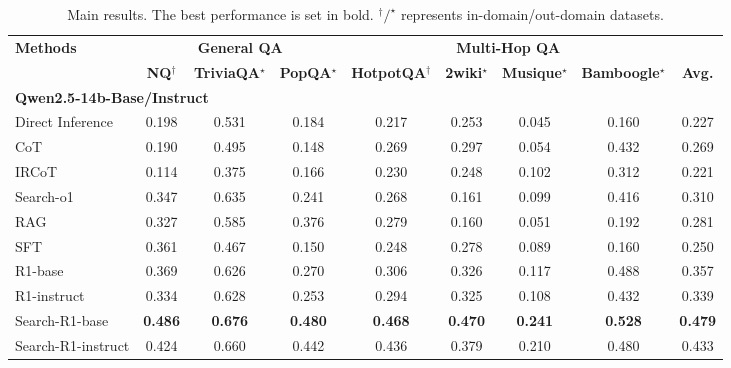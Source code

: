 \begin{table}[h]
    \centering
    \scriptsize
    \setlength{\tabcolsep}{4pt}
    \renewcommand{\arraystretch}{1.2}
    \caption{Main results. The best performance is set in bold. $^\dagger/^\star$ represents in-domain/out-domain datasets.}\label{apx:tab:largerllm}
    \begin{tabular}{lcccccccc}
        \toprule
        \textbf{Methods} & \multicolumn{3}{c}{\textbf{General QA}} & \multicolumn{4}{c}{\textbf{Multi-Hop QA}} \\
        \cmidrule{2-9}
         & \textbf{NQ$^\dagger$} & \textbf{TriviaQA$^\star$} & \textbf{PopQA$^\star$} & \textbf{HotpotQA$^\dagger$} & \textbf{2wiki$^\star$} & \textbf{Musique$^\star$} & \textbf{Bamboogle$^\star$} & \textbf{Avg.} \\
        \midrule
        \multicolumn{8}{l}{\textbf{Qwen2.5-14b-Base/Instruct}} \\
        Direct Inference & 0.198 & 0.531 & 0.184 & 0.217 & 0.253 & 0.045 & 0.160 & 0.227 \\
        CoT & 0.190 & 0.495 & 0.148 & 0.269 & 0.297 & 0.054 & 0.432 & 0.269 \\
        IRCoT & 0.114 & 0.375 & 0.166 & 0.230 & 0.248 & 0.102 & 0.312 & 0.221 \\
        Search-o1 & 0.347 & 0.635 & 0.241 & 0.268 & 0.161 & 0.099 & 0.416 & 0.310 \\
        RAG & 0.327 & 0.585 & 0.376 & 0.279 & 0.160 & 0.051 & 0.192 & 0.281 \\
        SFT & 0.361 & 0.467 & 0.150 & 0.248 & 0.278 & 0.089 & 0.160 & 0.250 \\
        R1-base & 0.369 & 0.626 & 0.270 & 0.306 & 0.326 & 0.117 & 0.488 & 0.357 \\
        R1-instruct & 0.334 & 0.628 & 0.253 & 0.294 & 0.325 & 0.108 & 0.432 & 0.339  \\
        \hdashline
        Search-R1-base &  \textbf{0.486} & \textbf{0.676} & \textbf{0.480} & \textbf{0.468} & \textbf{0.470} & \textbf{0.241} & \textbf{0.528} & \textbf{0.479} \\
        Search-R1-instruct & 0.424 & 0.660 & 0.442 & 0.436 & 0.379 & 0.210 & 0.480 & 0.433  \\

\end{tabular}
\end{table}
